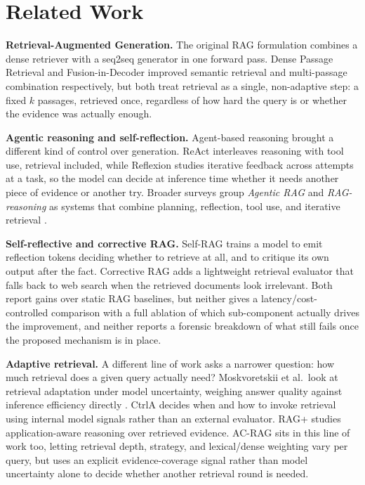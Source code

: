 \documentclass[conference]{IEEEtran}
\begin{document}
\section{Related Work}
\label{sec:related}

\textbf{Retrieval-Augmented Generation.} The original RAG formulation
\cite{lewis2020rag} combines a dense retriever with a seq2seq generator in one forward
pass. Dense Passage Retrieval \cite{karpukhin2020dpr} and Fusion-in-Decoder
\cite{izacard2021fid} improved semantic retrieval and multi-passage combination
respectively, but both treat retrieval as a single, non-adaptive step: a fixed $k$
passages, retrieved once, regardless of how hard the query is or whether the evidence
was actually enough.

\textbf{Agentic reasoning and self-reflection.} Agent-based reasoning brought a
different kind of control over generation. ReAct \cite{yao2023react} interleaves
reasoning with tool use, retrieval included, while Reflexion \cite{shinn2023reflexion}
studies iterative feedback across attempts at a task, so the model can decide at
inference time whether it needs another piece of evidence or another try. Broader
surveys group \emph{Agentic RAG} and \emph{RAG-reasoning} as systems that combine
planning, reflection, tool use, and iterative retrieval
\cite{singh2025agenticrag,li2025ragreasoning,mishra2026sokagentic}.

\textbf{Self-reflective and corrective RAG.} Self-RAG \cite{selfrag} trains a model to
emit reflection tokens deciding whether to retrieve at all, and to critique its own
output after the fact. Corrective RAG \cite{crag} adds a lightweight retrieval
evaluator that falls back to web search when the retrieved documents look irrelevant.
Both report gains over static RAG baselines, but neither gives a latency/cost-controlled
comparison with a full ablation of which sub-component actually drives the
improvement, and neither reports a forensic breakdown of what still fails once the
proposed mechanism is in place.

\textbf{Adaptive retrieval.} A different line of work asks a narrower question: how
much retrieval does a given query actually need? Moskvoretskii et al.\ look at
retrieval adaptation under model uncertainty, weighing answer quality against
inference efficiency directly \cite{moskvoretskii2025adaptive}. CtrlA
\cite{liu2025ctrla} decides when and how to invoke retrieval using internal model
signals rather than an external evaluator. RAG+ \cite{wang2025ragplus} studies
application-aware reasoning over retrieved evidence. AC-RAG sits in this line of work
too, letting retrieval depth, strategy, and lexical/dense weighting vary per query, but
uses an explicit evidence-coverage signal rather than model uncertainty alone to decide
whether another retrieval round is needed.
\end{document}
